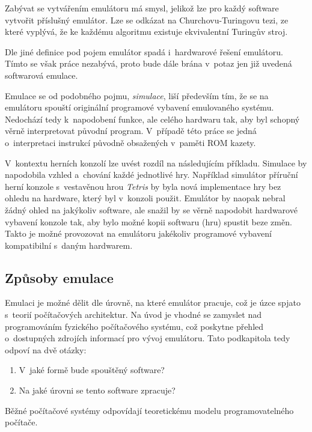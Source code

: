\begin{note}[Emulovatelnost]
	Zabývat se vytvářením emulátoru má smysl, jelikož lze pro každý software vytvořit příslušný emulátor. Lze se odkázat na Churchovu-Turingovu tezi, ze které vyplývá, že ke každému algoritmu existuje ekvivalentní Turingův stroj.
\end{note}

Dle jiné definice pod pojem emulátor spadá i~hardwarové řešení emulátoru. Tímto se však práce nezabývá, proto bude dále brána v~potaz jen již uvedená softwarová emulace.

Emulace se od podobného pojmu, \emph{simulace}, liší především tím, že se na emulátoru spouští originální programové vybavení emulovaného systému. Nedochází tedy k~napodobení funkce, ale celého hardwaru tak, aby byl schopný věrně interpretovat původní program. V~případě této práce se jedná o~interpretaci instrukcí původně obsažených v~paměti ROM kazety.

\begin{example}
V~kontextu herních konzolí lze uvést rozdíl na následujícím příkladu. Simulace by napodobila vzhled a~chování každé jednotlivé hry. Například simulátor příruční herní konzole s~vestavěnou hrou \emph{Tetris} by byla nová implementace hry bez ohledu na hardware, který byl v~konzoli použit. Emulátor by naopak nebral žádný ohled na jakýkoliv software, ale snažil by se věrně napodobit hardwarové vybavení konzole tak, aby bylo možné kopii softwaru (hru) spustit beze změn. Takto je možné provozovat na emulátoru jakékoliv programové vybavení kompatibilní s~daným hardwarem.~\cite{FulberGarcia2022:simulation-emulation}
\end{example}

\subsection{Způsoby emulace}
Emulaci je možné dělit dle úrovně, na které emulátor pracuje, což je úzce spjato s~teorií počítačových architektur. Na úvod je vhodné se zamyslet nad programováním fyzického počítačového systému, což poskytne přehled o~dostupných zdrojích informací pro vývoj emulátoru. Tato podkapitola tedy odpoví na dvě otázky:
\begin{enumerate}
	\item V~jaké formě bude spouštěný software?
	\item Na jaké úrovni se tento software zpracuje?
\end{enumerate}

Běžné počítačové systémy odpovídají teoretickému modelu programovatelného počítače.

